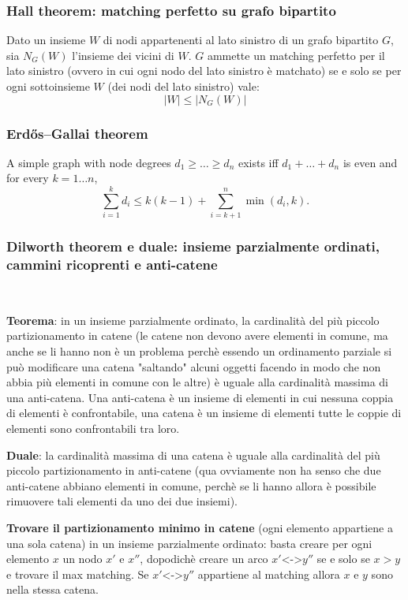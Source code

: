 \subsubsection{Hall theorem: matching perfetto su grafo bipartito}
Dato un insieme $W$ di nodi appartenenti al lato sinistro di un grafo bipartito $G$, sia $N_G(W)$ l'insieme dei vicini di $W$. $G$ ammette un matching perfetto per il lato sinistro (ovvero in cui ogni nodo del lato sinistro è matchato) se e solo se per ogni sottoinsieme $W$ (dei nodi del lato sinistro) vale: $$|W|\leq|N_G(W)|$$

\subsubsection{Erdős–Gallai theorem}
		A simple graph with node degrees $d_1 \ge \dots \ge d_n$ exists iff $d_1 + \dots + d_n$ is even and for every $k = 1\dots n$,
		\[ \sum _{i=1}^{k}d_{i}\leq k(k-1)+\sum _{i=k+1}^{n}\min(d_{i},k). \]

\subsubsection{Dilworth theorem e duale: insieme parzialmente ordinati, cammini ricoprenti e anti-catene}
\,

\textbf{Teorema}: in un insieme parzialmente ordinato, la cardinalità del più piccolo partizionamento in catene (le catene non devono avere elementi in comune, ma anche se li hanno 
non è un problema perchè essendo un ordinamento parziale si può modificare una catena  "saltando" alcuni oggetti facendo in modo che non abbia più elementi in comune con le altre) è
uguale alla cardinalità massima di una anti-catena. Una anti-catena è un insieme di elementi in cui nessuna coppia di elementi è confrontabile, una catena è un insieme di elementi 
tutte le coppie di elementi sono  confrontabili tra loro. 

\textbf{Duale}: la cardinalità massima di una catena è uguale alla cardinalità del più piccolo partizionamento in anti-catene (qua 
ovviamente non ha senso che due anti-catene abbiano elementi in comune, perchè se li hanno allora è possibile rimuovere tali elementi da uno dei due insiemi). 

\textbf{Trovare il partizionamento minimo in catene} (ogni elemento appartiene a una sola catena) in un insieme parzialmente ordinato: basta creare per ogni elemento $x$ un nodo $x'$ e $x''$, dopodichè creare un arco $x'$<->$y''$ se e solo se $x>y$ e trovare il max matching. Se
$x'$<->$y''$ appartiene al matching allora $x$ e $y$ sono nella stessa catena. 

